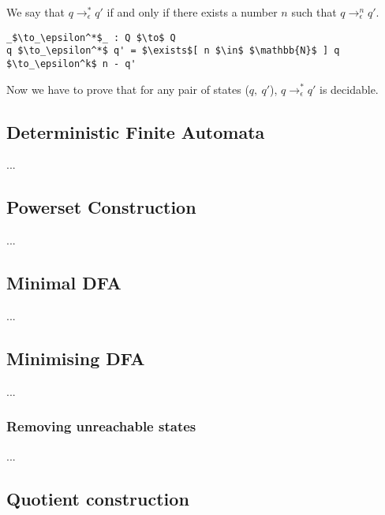 \begin{defn}
\noindent We say that \(q \to_\epsilon^* q'\) if and only if there
exists a number \(n\) such that \(q \to_\epsilon^n q'\). 
\end{defn}

\begin{lstlisting}[mathescape=true]
_$\to_\epsilon^*$_ : Q $\to$ Q
q $\to_\epsilon^*$ q' = $\exists$[ n $\in$ $\mathbb{N}$ ] q $\to_\epsilon^k$ n - q'
\end{lstlisting}

\par Now we have to prove that for any pair of states (\(q,\ q'\)),
\(q \to_\epsilon^* q'\) is decidable. 



\subsection{Deterministic Finite Automata}
\par ...


\subsection{Powerset Construction}
\par ...


\subsection{Minimal DFA}
\par ...


\subsection{Minimising DFA}
\par ...

\subsubsection{Removing unreachable states}
\par ...

\subsection{Quotient construction}